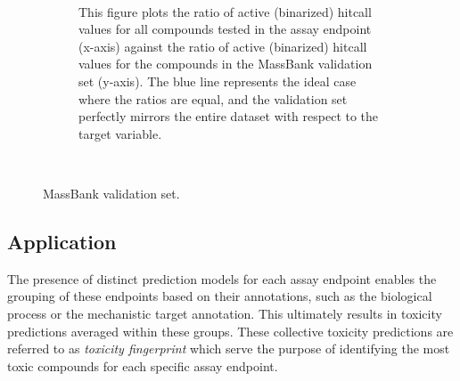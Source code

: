 \begin{enumerate}
\begin{figure}[h]
\begin{subfigure}[b]{0.48\textwidth}
            \caption{This figure plots the ratio of active (binarized) hitcall values for all compounds tested in the assay endpoint (x-axis) against the ratio of active (binarized) hitcall values for the compounds in the MassBank validation set (y-axis). The blue line represents the ideal case where the ratios are equal, and the validation set perfectly mirrors the entire dataset with respect to the target variable.}
            ~\label{fig:activity_ratio_comparison}
        \end{subfigure}
        \caption{MassBank validation set.}
        ~\label{fig:Massbank_validation}
    \end{figure}
\end{enumerate}


\subsection{Application}
The presence of distinct prediction models for each assay endpoint enables the grouping of these endpoints based on their annotations, such as the biological process or the mechanistic target annotation. This ultimately results in toxicity predictions averaged within these groups. These collective toxicity predictions are referred to as \emph{toxicity fingerprint} which serve the purpose of identifying the most toxic compounds for each specific assay endpoint.


